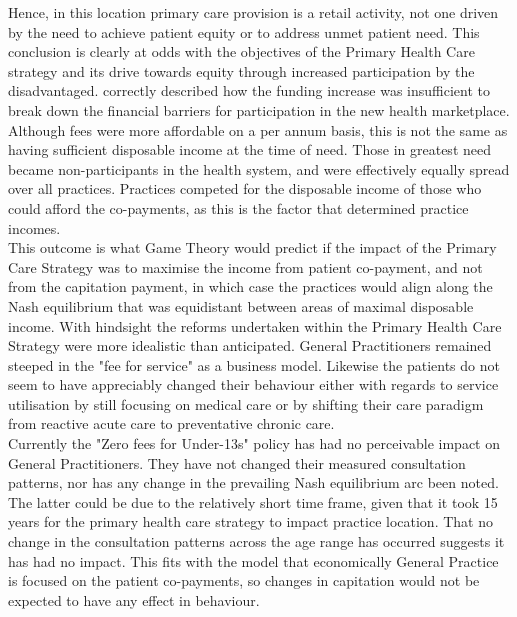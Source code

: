 \documentclass[11pt,a4paper]{article}
\begin{document}
Hence, in this location primary care provision is a retail activity, not one driven by the need to achieve patient equity or to address unmet patient need. This conclusion is clearly at odds with the objectives of the Primary Health Care strategy and its drive towards equity through increased participation by the disadvantaged. \citet{cumming2008reforming} correctly described how the funding increase was insufficient to break down the financial barriers for participation in the new health marketplace. Although fees were more affordable on a per annum basis, this is not the same as having sufficient disposable income at the time of need. Those in greatest need became non-participants in the health system, and were effectively equally spread over all practices. Practices competed for the disposable income of those who could afford the co-payments, as this is the factor that determined practice incomes.\\


This outcome is what Game Theory would predict if the impact of the Primary Care Strategy was to maximise the income from patient co-payment, and not from the capitation payment, in which case  the practices would align along the Nash equilibrium that was equidistant between areas of maximal disposable income. With hindsight the reforms undertaken within the Primary Health Care Strategy were more idealistic than anticipated. General Practitioners remained steeped in the "fee for service" as a business model. Likewise the patients do not seem to have appreciably changed their behaviour either with regards to service utilisation by still focusing on medical care or by shifting their care paradigm from reactive acute care to preventative chronic care. \\


Currently the "Zero fees for Under-13s" policy has had no perceivable impact on General Practitioners. They have not changed their measured consultation patterns, nor has any change in the prevailing Nash equilibrium arc been noted. The latter could be due to the relatively short time frame, given that it took 15 years for the primary health care strategy to impact practice location. That no change in the consultation patterns across the age range has occurred suggests it has had no impact. This fits with the model that economically General Practice is focused on the patient co-payments, so changes in capitation would not be expected to have any effect in behaviour.\\
\end{document}
